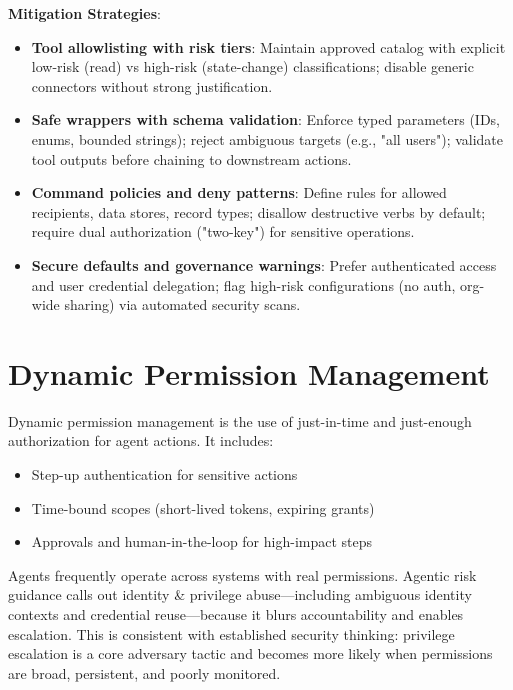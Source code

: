 \begin{TNtwocol}
    \textbf{Mitigation Strategies}:

    \begin{itemize}
        \item \textbf{Tool allowlisting with risk tiers}: Maintain approved catalog with explicit low-risk (read) vs high-risk (state-change) classifications; disable generic connectors without strong justification.

        \item \textbf{Safe wrappers with schema validation}: Enforce typed parameters (IDs, enums, bounded strings); reject ambiguous targets (e.g., "all users"); validate tool outputs before chaining to downstream actions.

        \item \textbf{Command policies and deny patterns}: Define rules for allowed recipients, data stores, record types; disallow destructive verbs by default; require dual authorization ("two-key") for sensitive operations.

        \item \textbf{Secure defaults and governance warnings}: Prefer authenticated access and user credential delegation; flag high-risk configurations (no auth, org-wide sharing) via automated security scans.
    \end{itemize}


    \section{Dynamic Permission Management}

    Dynamic permission management is the use of just-in-time and just-enough authorization for agent actions. It includes:

    \begin{itemize}
        \item Step-up authentication for sensitive actions
        \item Time-bound scopes (short-lived tokens, expiring grants)
        \item Approvals and human-in-the-loop for high-impact steps
    \end{itemize}

    Agents frequently operate across systems with real permissions. Agentic risk guidance calls out identity & privilege abuse—including ambiguous identity contexts and credential reuse—because it blurs accountability and enables escalation.  This is consistent with established security thinking: privilege escalation is a core adversary tactic and becomes more likely when permissions are broad, persistent, and poorly monitored.


\end{TNtwocol}
